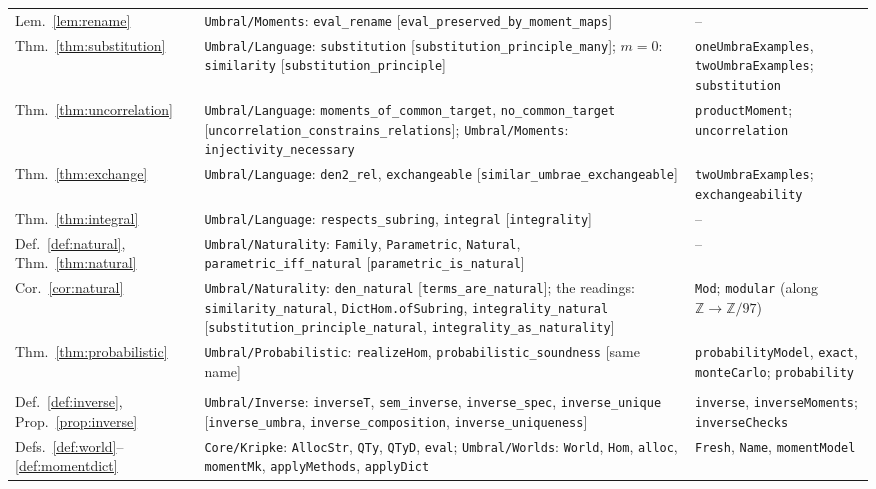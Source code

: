 \documentclass[11pt,a4paper]{report}
\theoremstyle{plain}
\theoremstyle{definition}
\theoremstyle{remark}
\newcommand{\ZZ}{\mathbb{Z}}
\begin{document}
{\begin{longtable}{@{}>{\raggedright\arraybackslash}p{2.4cm}>{\raggedright\arraybackslash}p{6.1cm}>{\raggedright\arraybackslash}p{4.9cm}@{}}
Lem.~\ref{lem:rename} & \texttt{Umbral/Moments}: \texttt{eval\_rename} [\texttt{eval\_preserved\_by\_moment\_maps}] & -- \\
Thm.~\ref{thm:substitution} & \texttt{Umbral/Language}: \texttt{substitution} [\texttt{substitution\_principle\_many}]; $m = 0$: \texttt{similarity} [\texttt{substitution\_principle}] & \texttt{oneUmbraExamples}, \texttt{twoUmbraExamples}; \texttt{substitution} \\
Thm.~\ref{thm:uncorrelation} & \texttt{Umbral/Language}: \texttt{moments\_of\_common\_target}, \texttt{no\_common\_target} [\texttt{uncorrelation\_constrains\_relations}]; \texttt{Umbral/Moments}: \texttt{injectivity\_necessary} & \texttt{productMoment}; \texttt{uncorrelation} \\
Thm.~\ref{thm:exchange} & \texttt{Umbral/Language}: \texttt{den2\_rel}, \texttt{exchangeable} [\texttt{similar\_umbrae\_exchangeable}] & \texttt{twoUmbraExamples}; \texttt{exchangeability} \\
Thm.~\ref{thm:integral} & \texttt{Umbral/Language}: \texttt{respects\_subring}, \texttt{integral} [\texttt{integrality}] & -- \\
Def.~\ref{def:natural}, Thm.~\ref{thm:natural} & \texttt{Umbral/Naturality}: \texttt{Family}, \texttt{Parametric}, \texttt{Natural}, \texttt{parametric\_iff\_natural} [\texttt{parametric\_is\_natural}] & -- \\
Cor.~\ref{cor:natural} & \texttt{Umbral/Naturality}: \texttt{den\_natural} [\texttt{terms\_are\_natural}]; the readings: \texttt{similarity\_natural}, \texttt{DictHom.ofSubring}, \texttt{integrality\_natural} [\texttt{substitution\_principle\_natural}, \texttt{integrality\_as\_naturality}] & \texttt{Mod}; \texttt{modular} (along $\ZZ \to \ZZ/97$) \\
Thm.~\ref{thm:probabilistic} & \texttt{Umbral/Probabilistic}: \texttt{realizeHom}, \texttt{probabilistic\_soundness} [same name] & \texttt{probabilityModel}, \texttt{exact}, \texttt{monteCarlo}; \texttt{probability} \\
\midrule
\multicolumn{3}{@{}l}{\emph{Chapter~\ref{ch:full}}} \\
Def.~\ref{def:inverse}, Prop.~\ref{prop:inverse} & \texttt{Umbral/Inverse}: \texttt{inverseT}, \texttt{sem\_inverse}, \texttt{inverse\_spec}, \texttt{inverse\_unique} [\texttt{inverse\_umbra}, \texttt{inverse\_composition}, \texttt{inverse\_uniqueness}] & \texttt{inverse}, \texttt{inverseMoments}; \texttt{inverseChecks} \\
Defs.~\ref{def:world}--\ref{def:momentdict} & \texttt{Core/Kripke}: \texttt{AllocStr}, \texttt{QTy}, \texttt{QTyD}, \texttt{eval}; \texttt{Umbral/Worlds}: \texttt{World}, \texttt{Hom}, \texttt{alloc}, \texttt{momentMk}, \texttt{applyMethods}, \texttt{applyDict} & \texttt{Fresh}, \texttt{Name}, \texttt{momentModel} \\

\end{longtable}}
\end{document}
